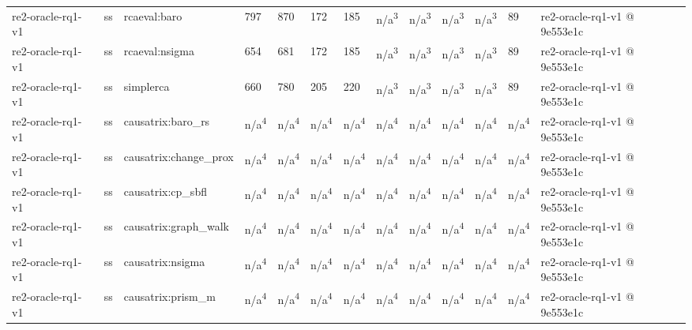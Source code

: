 \begin{table}[t]
\begin{tabular}{lllllllllllll}
re2-oracle-rq1-v1 & ss & rcaeval:baro & 797 & 870 & 172 & 185 & n/a\textsuperscript{3} & n/a\textsuperscript{3} & n/a\textsuperscript{3} & n/a\textsuperscript{3} & 89 & re2-oracle-rq1-v1 @ 9e553e1c \\
re2-oracle-rq1-v1 & ss & rcaeval:nsigma & 654 & 681 & 172 & 185 & n/a\textsuperscript{3} & n/a\textsuperscript{3} & n/a\textsuperscript{3} & n/a\textsuperscript{3} & 89 & re2-oracle-rq1-v1 @ 9e553e1c \\
re2-oracle-rq1-v1 & ss & simplerca & 660 & 780 & 205 & 220 & n/a\textsuperscript{3} & n/a\textsuperscript{3} & n/a\textsuperscript{3} & n/a\textsuperscript{3} & 89 & re2-oracle-rq1-v1 @ 9e553e1c \\
re2-oracle-rq1-v1 & ss & causatrix:baro\_rs & n/a\textsuperscript{4} & n/a\textsuperscript{4} & n/a\textsuperscript{4} & n/a\textsuperscript{4} & n/a\textsuperscript{4} & n/a\textsuperscript{4} & n/a\textsuperscript{4} & n/a\textsuperscript{4} & n/a\textsuperscript{4} & re2-oracle-rq1-v1 @ 9e553e1c \\
re2-oracle-rq1-v1 & ss & causatrix:change\_prox & n/a\textsuperscript{4} & n/a\textsuperscript{4} & n/a\textsuperscript{4} & n/a\textsuperscript{4} & n/a\textsuperscript{4} & n/a\textsuperscript{4} & n/a\textsuperscript{4} & n/a\textsuperscript{4} & n/a\textsuperscript{4} & re2-oracle-rq1-v1 @ 9e553e1c \\
re2-oracle-rq1-v1 & ss & causatrix:cp\_sbfl & n/a\textsuperscript{4} & n/a\textsuperscript{4} & n/a\textsuperscript{4} & n/a\textsuperscript{4} & n/a\textsuperscript{4} & n/a\textsuperscript{4} & n/a\textsuperscript{4} & n/a\textsuperscript{4} & n/a\textsuperscript{4} & re2-oracle-rq1-v1 @ 9e553e1c \\
re2-oracle-rq1-v1 & ss & causatrix:graph\_walk & n/a\textsuperscript{4} & n/a\textsuperscript{4} & n/a\textsuperscript{4} & n/a\textsuperscript{4} & n/a\textsuperscript{4} & n/a\textsuperscript{4} & n/a\textsuperscript{4} & n/a\textsuperscript{4} & n/a\textsuperscript{4} & re2-oracle-rq1-v1 @ 9e553e1c \\
re2-oracle-rq1-v1 & ss & causatrix:nsigma & n/a\textsuperscript{4} & n/a\textsuperscript{4} & n/a\textsuperscript{4} & n/a\textsuperscript{4} & n/a\textsuperscript{4} & n/a\textsuperscript{4} & n/a\textsuperscript{4} & n/a\textsuperscript{4} & n/a\textsuperscript{4} & re2-oracle-rq1-v1 @ 9e553e1c \\
re2-oracle-rq1-v1 & ss & causatrix:prism\_m & n/a\textsuperscript{4} & n/a\textsuperscript{4} & n/a\textsuperscript{4} & n/a\textsuperscript{4} & n/a\textsuperscript{4} & n/a\textsuperscript{4} & n/a\textsuperscript{4} & n/a\textsuperscript{4} & n/a\textsuperscript{4} & re2-oracle-rq1-v1 @ 9e553e1c \\

\end{tabular}
\end{table}
